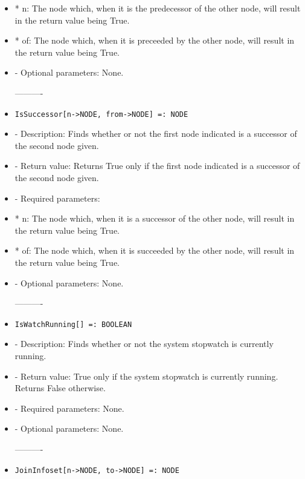 \begin{itemize}
\bd
\item
*  n:  The node which, when it is the predecessor of the other node,
will result in the return value being True.
\item
*  of:  The node which, when it is preceeded by the other node, will
result in the return value being True.
\ed

\item
- Optional parameters:  None.
\ed

----------

\item
\begin{verbatim}
IsSuccessor[n->NODE, from->NODE] =: NODE
\end{verbatim}

\bd
\item
- Description:  Finds whether or not the first node indicated is a 
successor of the second node given.
\item
- Return value:  Returns True only if the first node indicated is a successor of the second node given.
\item
- Required parameters:
	
\bd
\item
*  n:  The node which, when it is a successor of the other node, will
result in the return value being True.
\item
*  of:  The node which, when it is succeeded by the other node, will
result in the return value being True.
\ed

\item
- Optional parameters:  None.
\ed

----------

\item
\begin{verbatim}
IsWatchRunning[] =: BOOLEAN
\end{verbatim}

\bd
\item
- Description:  Finds whether or not the system stopwatch is currently
running.
\item
- Return value:  True only if the system stopwatch is currently running.
Returns False otherwise.
\item
- Required parameters:  None.
\item
- Optional parameters:  None.
\ed

----------
\item
\begin{verbatim}
JoinInfoset[n->NODE, to->NODE] =: NODE
\end{verbatim}


\end{itemize}
